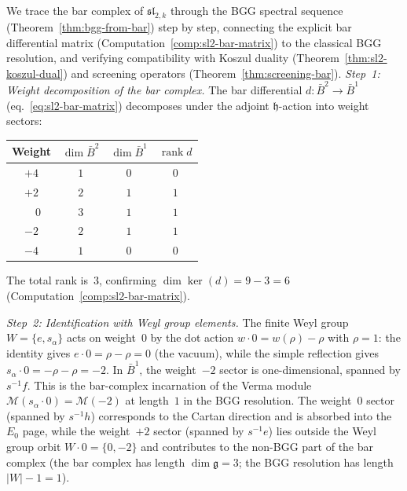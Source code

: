 \begin{computation}
\label{comp:bgg-sl2-computation}
We trace the bar complex of $\widehat{\mathfrak{sl}}_{2,k}$ through
the BGG spectral sequence (Theorem~\ref{thm:bgg-from-bar}) step by
step, connecting the explicit bar differential matrix
(Computation~\ref{comp:sl2-bar-matrix}) to the classical BGG
resolution, and verifying compatibility with Koszul duality
(Theorem~\ref{thm:sl2-koszul-dual}) and screening operators
(Theorem~\ref{thm:screening-bar}). \emph{Step~1: Weight decomposition of the bar complex.}
The bar differential $d\colon \bar{B}^2 \to \bar{B}^1$
(eq.~\eqref{eq:sl2-bar-matrix}) decomposes under the adjoint
$\mathfrak{h}$-action into weight sectors:
\begin{center}
\renewcommand{\arraystretch}{1.2}
\begin{tabular}{cccc}
\textbf{Weight} & $\dim \bar{B}^2$ & $\dim \bar{B}^1$
 & $\operatorname{rank} d$ \\
\hline
$+4$ & $1$ & $0$ & $0$ \\
$+2$ & $2$ & $1$ & $1$ \\
$\phantom{+}0$ & $3$ & $1$ & $1$ \\
$-2$ & $2$ & $1$ & $1$ \\
$-4$ & $1$ & $0$ & $0$
\end{tabular}
\end{center}
The total rank is~$3$, confirming
$\dim \ker(d) = 9 - 3 = 6$
(Computation~\ref{comp:sl2-bar-matrix}).

\emph{Step~2: Identification with Weyl group elements.}
The finite Weyl group $W = \{e, s_\alpha\}$ acts on weight~$0$ by
the dot action $w \cdot 0 = w(\rho) - \rho$ with $\rho = 1$: the identity gives $e \cdot 0 = \rho - \rho = 0$ (the vacuum), while the simple reflection gives $s_\alpha \cdot 0 = -\rho - \rho = -2$.
In $\bar{B}^1$, the weight~$-2$ sector is one-dimensional,
spanned by $s^{-1}f$. This is the bar-complex incarnation of the
Verma module $\mathcal{M}(s_\alpha \cdot 0) = \mathcal{M}(-2)$
at length~$1$ in the BGG resolution. The weight~$0$ sector
(spanned by $s^{-1}h$) corresponds to the Cartan direction and
is absorbed into the $E_0$ page, while the weight~$+2$ sector
(spanned by $s^{-1}e$) lies outside the Weyl group orbit
$W \cdot 0 = \{0, -2\}$ and contributes to the
non-BGG part of the bar complex
(the bar complex has length $\dim \mathfrak{g} = 3$; the BGG
resolution has length $|W| - 1 = 1$).


\end{computation}
